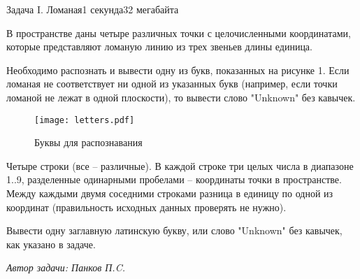 \documentclass[11pt,a4paper,oneside]{article}
\begin{document}
\begin{problem}{Задача I. Ломаная}{1 секунда}{32 мегабайта}

В пространстве даны четыре различных точки с целочисленными координатами, которые представляют ломаную линию из трех звеньев длины единица.

Необходимо распознать и вывести одну из букв, показанных на рисунке 1.
Если ломаная не соответствует ни одной из указанных букв (например, если точки ломаной не лежат в одной плоскости), то вывести слово "Unknown" \hspace{0.3cm} без кавычек.



\begin{figure}[ht]
\centering
\texttt{[image: letters.pdf]}
\caption{Буквы для распознавания}
\end{figure}



\InputFile
Четыре строки (все – различные). 
В каждой строке три целых числа в диапазоне 1..9, 
разделенные одинарными пробелами -- координаты точки в пространстве. 
Между каждыми двумя соседними строками разница в единицу 
по одной из координат (правильность исходных данных проверять не нужно). 


\OutputFile
Вывести одну заглавную латинскую букву, или слово "Unknown" \hspace{0.1cm} без кавычек, как указано в задаче.

\Examples

\begin{example}%
%
%
\end{example}



\vspace{1.0cm}
\hfill \textit{Автор задачи: Панков П.C.}
\medskip\noindent




\end{problem}
\end{document}
